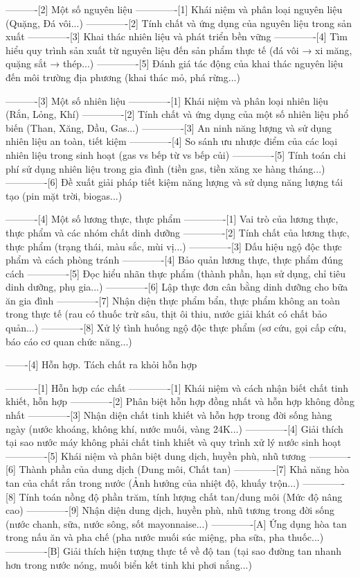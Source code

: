 ----------[2] Một số nguyên liệu
-------------[1] Khái niệm và phân loại nguyên liệu (Quặng, Đá vôi...)
-------------[2] Tính chất và ứng dụng của nguyên liệu trong sản xuất
-------------[3] Khai thác nhiên liệu và phát triển bền vững
-------------[4] Tìm hiểu quy trình sản xuất từ nguyên liệu đến sản phẩm thực tế (đá vôi → xi măng, quặng sắt → thép...)
-------------[5] Đánh giá tác động của khai thác nguyên liệu đến môi trường địa phương (khai thác mỏ, phá rừng...)

----------[3] Một số nhiên liệu
-------------[1] Khái niệm và phân loại nhiên liệu (Rắn, Lỏng, Khí)
-------------[2] Tính chất và ứng dụng của một số nhiên liệu phổ biến (Than, Xăng, Dầu, Gas...)
-------------[3] An ninh năng lượng và sử dụng nhiên liệu an toàn, tiết kiệm
-------------[4] So sánh ưu nhược điểm của các loại nhiên liệu trong sinh hoạt (gas vs bếp từ vs bếp củi)
-------------[5] Tính toán chi phí sử dụng nhiên liệu trong gia đình (tiền gas, tiền xăng xe hàng tháng...)
-------------[6] Đề xuất giải pháp tiết kiệm năng lượng và sử dụng năng lượng tái tạo (pin mặt trời, biogas...)

----------[4] Một số lương thực, thực phẩm
-------------[1] Vai trò của lương thực, thực phẩm và các nhóm chất dinh dưỡng
-------------[2] Tính chất của lương thực, thực phẩm (trạng thái, màu sắc, mùi vị...)
-------------[3] Dấu hiệu ngộ độc thực phẩm và cách phòng tránh
-------------[4] Bảo quản lương thực, thực phẩm đúng cách
-------------[5] Đọc hiểu nhãn thực phẩm (thành phần, hạn sử dụng, chỉ tiêu dinh dưỡng, phụ gia...)
-------------[6] Lập thực đơn cân bằng dinh dưỡng cho bữa ăn gia đình
-------------[7] Nhận diện thực phẩm bẩn, thực phẩm không an toàn trong thực tế (rau có thuốc trừ sâu, thịt ôi thiu, nước giải khát có chất bảo quản...)
-------------[8] Xử lý tình huống ngộ độc thực phẩm (sơ cứu, gọi cấp cứu, báo cáo cơ quan chức năng...)

-------[4] Hỗn hợp. Tách chất ra khỏi hỗn hợp

----------[1] Hỗn hợp các chất
-------------[1] Khái niệm và cách nhận biết chất tinh khiết, hỗn hợp
-------------[2] Phân biệt hỗn hợp đồng nhất và hỗn hợp không đồng nhất
-------------[3] Nhận diện chất tinh khiết và hỗn hợp trong đời sống hàng ngày (nước khoáng, không khí, nước muối, vàng 24K...)
-------------[4] Giải thích tại sao nước máy không phải chất tinh khiết và quy trình xử lý nước sinh hoạt
-------------[5] Khái niệm và phân biệt dung dịch, huyền phù, nhũ tương
-------------[6] Thành phần của dung dịch (Dung môi, Chất tan)
-------------[7] Khả năng hòa tan của chất rắn trong nước (Ảnh hưởng của nhiệt độ, khuấy trộn...)
-------------[8] Tính toán nồng độ phần trăm, tính lượng chất tan/dung môi (Mức độ nâng cao)
-------------[9] Nhận diện dung dịch, huyền phù, nhũ tương trong đời sống (nước chanh, sữa, nước sông, sốt mayonnaise...)
-------------[A] Ứng dụng hòa tan trong nấu ăn và pha chế (pha nước muối súc miệng, pha sữa, pha thuốc...)
-------------[B] Giải thích hiện tượng thực tế về độ tan (tại sao đường tan nhanh hơn trong nước nóng, muối biển kết tinh khi phơi nắng...)

